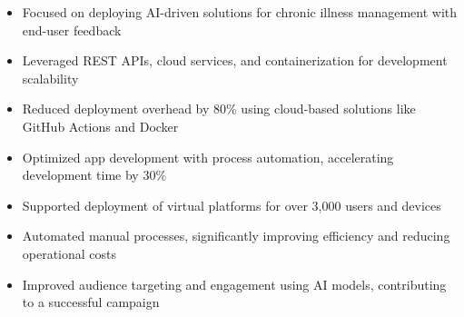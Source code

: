 \par\smallskip
\begin{minipage}{13.75cm}
  \begin{minipage}{6.5cm}
    \begin{itemize}
      \item Focused on deploying AI-driven solutions for chronic illness management with end-user feedback
      \item Leveraged REST APIs, cloud services, and containerization for development scalability
    \end{itemize}
  \end{minipage}
  \hfill
  \begin{minipage}{6.5cm}
    \begin{itemize}
      \item Reduced deployment overhead by 80\% using cloud-based solutions like GitHub Actions and Docker
      \item Optimized app development with process automation, accelerating development time by 30\%
    \end{itemize}
  \end{minipage}
\end{minipage}
\par\smallskip
\divider

\par\smallskip
\begin{minipage}{13.75cm}
  \begin{minipage}{6.5cm}
    \begin{itemize}
      \item Supported deployment of virtual platforms for over 3,000 users and devices
      \item Automated manual processes, significantly improving efficiency and reducing operational costs
    \end{itemize}
  \end{minipage}
  \hfill
  \begin{minipage}{6.5cm}
    \begin{itemize}
      \item Improved audience targeting and engagement using AI models, contributing to a successful campaign
    \end{itemize}
  \end{minipage}
\end{minipage}

